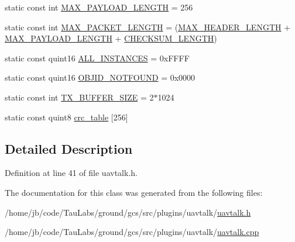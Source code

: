 \begin{DoxyCompactItemize}
\item 
static const int \hyperlink{group___u_a_v_talk_plugin_gac89ca6073b8cf1479a5e2468b3691db9}{\-M\-A\-X\-\_\-\-P\-A\-Y\-L\-O\-A\-D\-\_\-\-L\-E\-N\-G\-T\-H} = 256
\item 
static const int \hyperlink{group___u_a_v_talk_plugin_gab5a37286c5e8b676d49e134f26444a0c}{\-M\-A\-X\-\_\-\-P\-A\-C\-K\-E\-T\-\_\-\-L\-E\-N\-G\-T\-H} = (\hyperlink{group___u_a_v_talk_plugin_ga279763a8abdcb2fae7cb36916b36c1a8}{\-M\-A\-X\-\_\-\-H\-E\-A\-D\-E\-R\-\_\-\-L\-E\-N\-G\-T\-H} + \hyperlink{group___u_a_v_talk_plugin_gac89ca6073b8cf1479a5e2468b3691db9}{\-M\-A\-X\-\_\-\-P\-A\-Y\-L\-O\-A\-D\-\_\-\-L\-E\-N\-G\-T\-H} + \hyperlink{group___u_a_v_talk_plugin_ga094abac2d747f187a4b22bea1dd28ec0}{\-C\-H\-E\-C\-K\-S\-U\-M\-\_\-\-L\-E\-N\-G\-T\-H})
\item 
static const quint16 \hyperlink{group___u_a_v_talk_plugin_ga71e922ea4fa7f9e0a9fe89ebdd2fe75c}{\-A\-L\-L\-\_\-\-I\-N\-S\-T\-A\-N\-C\-E\-S} = 0x\-F\-F\-F\-F
\item 
static const quint16 \hyperlink{group___u_a_v_talk_plugin_gaa627c86aec4d382c9744541688fb66ef}{\-O\-B\-J\-I\-D\-\_\-\-N\-O\-T\-F\-O\-U\-N\-D} = 0x0000
\item 
static const int \hyperlink{group___u_a_v_talk_plugin_gaa84c0f2f2a83872a6f82f00969d9ddff}{\-T\-X\-\_\-\-B\-U\-F\-F\-E\-R\-\_\-\-S\-I\-Z\-E} = 2$\ast$1024
\item 
static const quint8 \hyperlink{group___u_a_v_talk_plugin_gac5c5c810a2edb31ed325bf2d54e1b289}{crc\-\_\-table} \mbox{[}256\mbox{]}
\end{DoxyCompactItemize}


\subsection{\-Detailed \-Description}


\-Definition at line 41 of file uavtalk.\-h.



\-The documentation for this class was generated from the following files\-:\begin{DoxyCompactItemize}
\item 
/home/jb/code/\-Tau\-Labs/ground/gcs/src/plugins/uavtalk/\hyperlink{uavtalk_8h}{uavtalk.\-h}\item 
/home/jb/code/\-Tau\-Labs/ground/gcs/src/plugins/uavtalk/\hyperlink{uavtalk_8cpp}{uavtalk.\-cpp}\end{DoxyCompactItemize}
